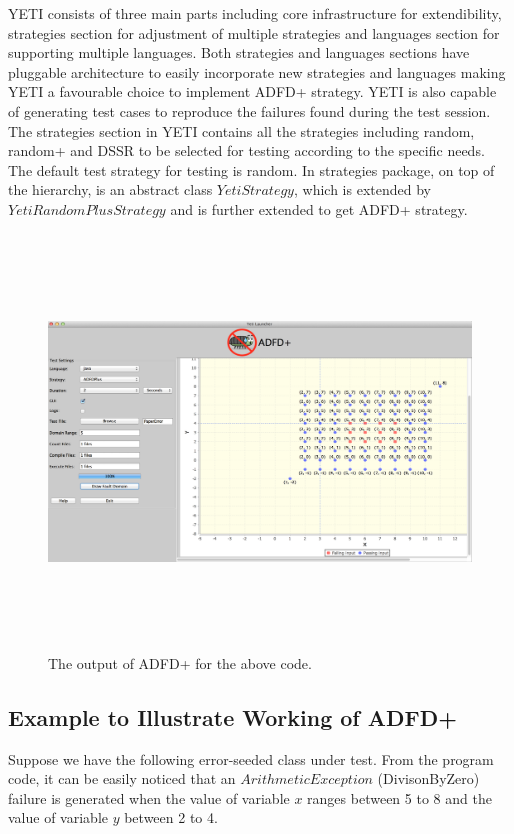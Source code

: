 YETI consists of three main parts including core infrastructure for extendibility, strategies section for adjustment of multiple strategies and 
languages section for supporting multiple languages. Both strategies and languages sections have pluggable architecture to easily incorporate new strategies and 
languages making YETI a favourable choice to implement ADFD+ strategy. YETI is also capable of generating test cases to reproduce the failures found during the test session. 
The strategies section in YETI contains all the strategies including random, random+ and DSSR to be selected for testing according to the specific needs. The default test 
strategy for testing is random. In strategies package, on top of the hierarchy, is an abstract class $YetiStrategy$, which is extended by $YetiRandomPlusStrategy$ and is further extended to get ADFD+ strategy.

\begin{figure}[ht]
\centering
\includegraphics[width=15.5cm,height=11cm]{chapter6/exampleError.png}
\caption{The output of ADFD+ for the above code.}
\label{fig:adfdPlusExample}
\end{figure}

\subsection{Example to Illustrate Working of ADFD+}\label{sec:intro6_5}
Suppose we have the following error-seeded class under test. From the program code, it can be easily noticed that an $ArithmeticException$ (DivisonByZero) failure is generated when the value of variable $x$ ranges between 5 to 8 and the value of variable $y$ between 2 to 4.

